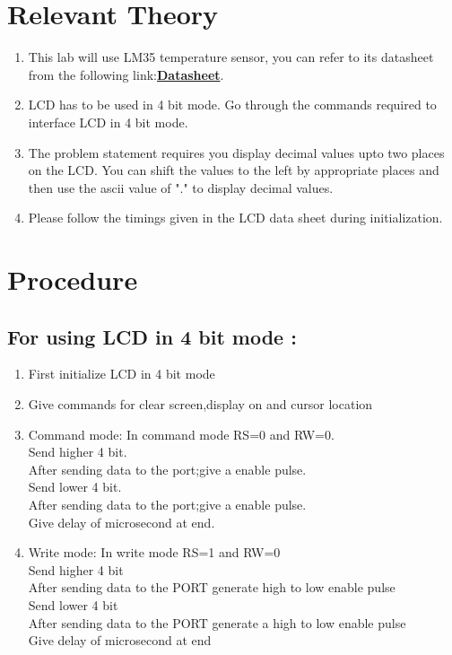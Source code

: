 \documentclass[a4paper,12pt,oneside]{book}
\begin{document}
\section {Relevant Theory}
\begin{enumerate}
\item This lab will use LM35 temperature sensor, you can refer to its datasheet from the following link:\href{http://www.ti.com/product/LM35/datasheet}{\textbf{Datasheet}}.
\item 
LCD has to be used in 4 bit mode. Go through the commands required to interface LCD in 4 bit mode.
\item 
The problem statement requires you display decimal values upto two places on the LCD. You can shift the values to the left by appropriate places and then use the ascii value of "." to display decimal values.  
\item 
Please follow the timings given in the LCD data sheet during initialization. 
\end{enumerate}


\section {Procedure}

\subsection{For using  LCD in 4 bit mode :}
\begin{enumerate}
\item First initialize LCD in 4 bit mode
\item Give commands for clear screen,display on and cursor location
\item Command mode:
 In command mode RS=0 and RW=0. \\
 Send higher 4 bit.\\
After sending data to the port;give a enable pulse.\\
 Send lower 4 bit.\\
 After sending data to the port;give a enable pulse.\\
 Give delay of microsecond at end.
\item Write mode:
In write mode RS=1 and RW=0\\
Send higher 4 bit\\ 
After sending data to the PORT generate high to low enable pulse \\
Send lower 4 bit\\ 
After sending data to the PORT generate a high to low enable pulse \\
Give delay of microsecond at end\\
\end{enumerate}
\newpage
\end{document}
